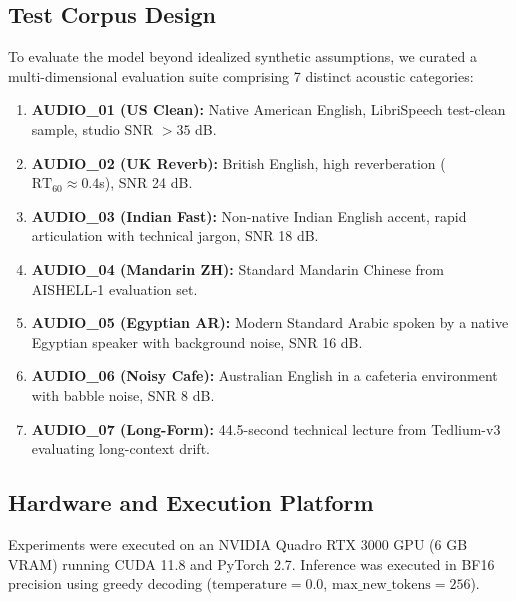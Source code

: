 \documentclass[conference]{IEEEtran}
\begin{document}
\subsection{Test Corpus Design}
To evaluate the model beyond idealized synthetic assumptions, we curated a multi-dimensional evaluation suite comprising 7 distinct acoustic categories:
\begin{enumerate}
    \item \textbf{AUDIO\_01 (US Clean):} Native American English, LibriSpeech test-clean sample, studio SNR $>35$ dB.
    \item \textbf{AUDIO\_02 (UK Reverb):} British English, high reverberation ($\text{RT}_{60} \approx 0.4$s), SNR 24 dB.
    \item \textbf{AUDIO\_03 (Indian Fast):} Non-native Indian English accent, rapid articulation with technical jargon, SNR 18 dB.
    \item \textbf{AUDIO\_04 (Mandarin ZH):} Standard Mandarin Chinese from AISHELL-1 evaluation set.
    \item \textbf{AUDIO\_05 (Egyptian AR):} Modern Standard Arabic spoken by a native Egyptian speaker with background noise, SNR 16 dB.
    \item \textbf{AUDIO\_06 (Noisy Cafe):} Australian English in a cafeteria environment with babble noise, SNR 8 dB.
    \item \textbf{AUDIO\_07 (Long-Form):} 44.5-second technical lecture from Tedlium-v3 evaluating long-context drift.
\end{enumerate}

\subsection{Hardware and Execution Platform}
Experiments were executed on an NVIDIA Quadro RTX 3000 GPU (6 GB VRAM) running CUDA 11.8 and PyTorch 2.7. Inference was executed in BF16 precision using greedy decoding ($\text{temperature} = 0.0$, $\text{max\_new\_tokens} = 256$).
\end{document}
